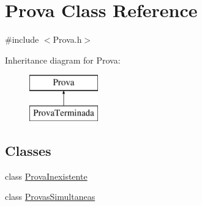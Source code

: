 \hypertarget{class_prova}{}\section{Prova Class Reference}
\label{class_prova}


{\ttfamily \#include $<$Prova.\+h$>$}

Inheritance diagram for Prova\+:\begin{figure}[H]
\begin{center}
\leavevmode
\includegraphics[height=2.000000cm]{class_prova}
\end{center}
\end{figure}
\subsection*{Classes}
\begin{DoxyCompactItemize}
\item 
class \hyperlink{class_prova_1_1_prova_inexistente}{Prova\+Inexistente}
\item 
class \hyperlink{class_prova_1_1_provas_simultaneas}{Provas\+Simultaneas}
\end{DoxyCompactItemize}
